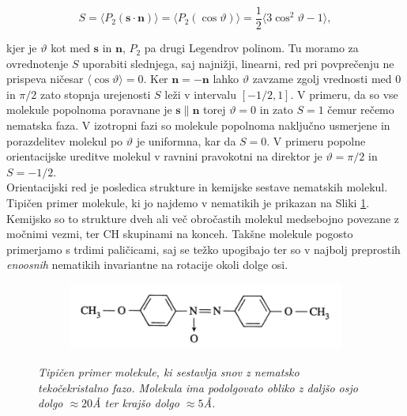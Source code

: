 \documentclass[longbibliography,slovene,a4paper,12pt]{book}
\begin{document}
\begin{equation}
S = \langle P_2(\mathbf{s} \cdot \mathbf{n}) \rangle  = \langle P_2(\cos \vartheta) \rangle = \frac{1}{2} \langle 3 \cos^2 \vartheta - 1 \rangle,
\end{equation}

kjer je $\vartheta$ kot med $\mathbf{s}$ in $\mathbf{n}$, $P_2$ pa drugi Legendrov polinom. Tu moramo za ovrednotenje $S$ uporabiti slednjega, saj najnižji, linearni, red pri povprečenju ne prispeva ničesar $\langle \cos \vartheta \rangle = 0$. Ker $\mathbf{n} = -\mathbf{n}$ lahko $\vartheta$ zavzame zgolj vrednosti med $0$ in $\pi/2$ zato stopnja urejenosti $S$ leži v intervalu $[-1/2,1]$. V primeru, da so vse molekule popolnoma poravnane je $\mathbf{s} \parallel \mathbf{n}$ torej $\vartheta = 0$ in zato $S = 1$ čemur rečemo nematska faza. V izotropni fazi so molekule popolnoma naključno usmerjene in porazdelitev molekul po $\vartheta$ je uniformna, kar da $S = 0$. V primeru popolne orientacijske ureditve molekul v ravnini pravokotni na direktor je $\vartheta = \pi/2$ in $S = -1/2$.\\

Orientacijski red je posledica strukture in kemijske sestave nematskih molekul. Tipičen primer molekule, ki jo najdemo v nematikih je prikazan na Sliki \ref{fig:nematicmolecule}. Kemijsko so to strukture dveh ali več obročastih molekul medsebojno povezane z močnimi vezmi, ter CH skupinami na konceh. Takšne molekule pogosto primerjamo s trdimi paličicami, saj se težko upogibajo ter so v najbolj preprostih  \emph{enoosnih} nematikih invariantne na rotacije okoli dolge osi.

\begin{figure}[h!]
	\centering
	\begin{subfigure}[b]{0.6\textwidth}
	\includegraphics[width=\textwidth]{slike/nematic_molecule.png}
	\end{subfigure}
	\caption{\emph{Tipičen primer molekule, ki sestavlja snov z nematsko tekočekristalno fazo. Molekula ima podolgovato obliko z daljšo osjo dolgo $\approx 20$Å ter krajšo dolgo $\approx 5$Å.}}
	\label{fig:nematicmolecule}
\end{figure}
\end{document}
